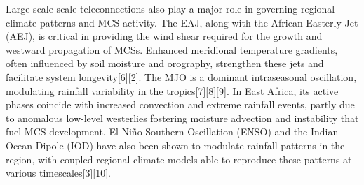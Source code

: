 Large-scale scale teleconnections also play a major role in governing regional climate patterns and MCS activity. The EAJ, along with the African Easterly Jet (AEJ), is critical in providing the wind shear required for the growth and westward propagation of MCSs. Enhanced meridional temperature gradients, often influenced by soil moisture and orography, strengthen these jets and facilitate system longevity[6][2]. The MJO is a dominant intraseasonal oscillation, modulating rainfall variability in the tropics[7][8][9]. In East Africa, its active phases coincide with increased convection and extreme rainfall events, partly due to anomalous low-level westerlies fostering moisture advection and instability that fuel MCS development. El Niño-Southern Oscillation (ENSO) and the Indian Ocean Dipole (IOD) have also been shown to modulate rainfall patterns in the region, with coupled regional climate models able to reproduce these patterns at various timescales[3][10].


